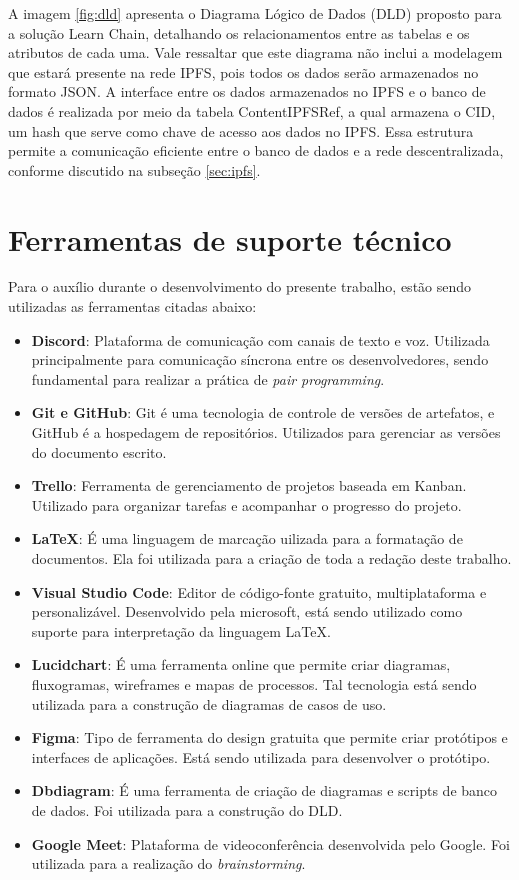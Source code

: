 A imagem \ref{fig:dld} apresenta o Diagrama Lógico de Dados (DLD) proposto para a solução Learn Chain, detalhando os relacionamentos entre as tabelas e os atributos de cada uma. Vale ressaltar que este diagrama não inclui a modelagem que estará presente na rede IPFS, pois todos os dados serão armazenados no formato JSON. A interface entre os dados armazenados no IPFS e o banco de dados é realizada por meio da tabela ContentIPFSRef, a qual armazena o CID, um hash que serve como chave de acesso aos dados no IPFS. Essa estrutura permite a comunicação eficiente entre o banco de dados e a rede descentralizada, conforme discutido na subseção \ref{sec:ipfs}.

\section{Ferramentas de suporte técnico}
Para o auxílio durante o desenvolvimento do presente trabalho, estão sendo utilizadas as ferramentas citadas abaixo:

\begin{itemize}
    \item \textbf{Discord}: Plataforma de comunicação com canais de texto e voz. Utilizada principalmente para comunicação síncrona entre os desenvolvedores, sendo fundamental para realizar a prática de \textit{pair programming}.
    \item \textbf{Git e GitHub}: Git é uma tecnologia de controle de versões de artefatos, e GitHub é a hospedagem de repositórios. Utilizados para gerenciar as versões do documento escrito.
    \item \textbf{Trello}: Ferramenta de gerenciamento de projetos baseada em Kanban. Utilizado para organizar tarefas e acompanhar o progresso do projeto.
    \item \textbf{LaTeX}: É uma linguagem de marcação uilizada para a formatação de documentos. Ela foi utilizada para a criação de toda a redação deste trabalho.
    \item \textbf{Visual Studio Code}: Editor de código-fonte gratuito, multiplataforma e personalizável. Desenvolvido pela microsoft, está sendo utilizado como suporte para interpretação da linguagem LaTeX.
    \item \textbf{Lucidchart}: É uma ferramenta online que permite criar diagramas, fluxogramas, wireframes e mapas de processos. Tal tecnologia está sendo utilizada para a construção de diagramas de casos de uso.
    \item \textbf{Figma}: Tipo de ferramenta do design gratuita que permite criar protótipos e interfaces de aplicações. Está sendo utilizada para desenvolver o protótipo.
    \item \textbf{Dbdiagram}: É uma ferramenta de criação de diagramas e scripts de banco de dados. Foi utilizada para a construção do DLD.
    \item \textbf{Google Meet}: Plataforma de videoconferência desenvolvida pelo Google. Foi utilizada para a realização do \textit{brainstorming}.
\end{itemize}